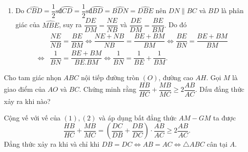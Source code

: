 \begin{ex}
{\begin{enumerate}
    \item Do $\widehat{CBD}=\dfrac{1}{2}\text{sđ}\wideparen{CD}=\dfrac{1}{2}\text{sđ}\wideparen{BD}=\widehat{BDN}=\widehat{DBE}$ nên $DN \parallel BC$ và $BD$ là phân giác của $\widehat{MBE}$, suy ra  $\dfrac{DE}{DM}=\dfrac{NE}{NB}$ và $\dfrac{DE}{DM}=\dfrac{BE}{BM}.$ Do đó 
    {\allowdisplaybreaks
    \begin{align*}
    & \dfrac{NE}{NB}=\dfrac{BE}{BM} \Leftrightarrow \dfrac{NE+NB}{NB}=\dfrac{BE+BM}{BM} \Leftrightarrow \dfrac{BE}{BN}=\dfrac{BE+BM}{BM}\\
     \Leftrightarrow & \dfrac{1}{BN}=\dfrac{BE+BM}{BE.BM} \Leftrightarrow \dfrac{1}{BN}=\dfrac{1}{BE}+\dfrac{1}{BM}.
    \end{align*}}
    \end{enumerate}
    }
\end{ex}

\begin{ex}%
    Cho tam giác nhọn $ABC$ nội tiếp đường tròn $(O)$, đường cao $AH$. Gọi $M$ là giao điểm của $AO$ và $BC$. Chứng minh rằng $\dfrac{HB}{HC}+\dfrac{MB}{MC} \geq 2\dfrac{AB}{AC}$. Dấu đẳng thức xảy ra khi nào?
\loigiai
    {
    {}
    Cộng vế với vế của $(1), (2)$ và áp dụng bất đẳng thức $AM-GM$ ta được
    $$\dfrac{HB}{HC}+\dfrac{MB}{MC}=\left(\dfrac{DC}{DB}+\dfrac{DB}{DC}\right)\cdot \dfrac{AB}{AC}\geq 2\dfrac{AB}{AC}.$$
    Đẳng thức xảy ra khi và chỉ khi $DB=DC\Leftrightarrow AB=AC \Leftrightarrow \triangle ABC$ cân tại $A$.
    }
\end{ex}


